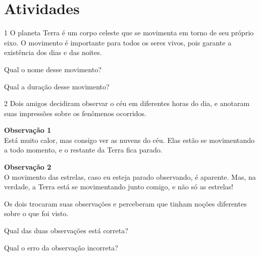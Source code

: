 \section*{Atividades}

\num{1} O planeta Terra é um corpo celeste que se movimenta em
torno de seu próprio eixo. O movimento é importante para todos os seres
vivos, pois garante a existência dos dias e das noites.

\begin{escolha}
\item Qual o nome desse movimento?\\

\item Qual a duração desse movimento?\\
\end{escolha}

\num{2} Dois amigos decidiram observar o céu em diferentes horas do
dia, e anotaram suas impressões sobre os fenômenos ocorridos.

\begin{mdframed}[linewidth=5pt,linecolor=salmao!20,backgroundcolor=salmao!20,roundcorner=20pt]
\textbf{Observação 1}\\
Está muito calor, mas consigo ver as nuvens
do céu. Elas estão se movimentando a todo momento, e o restante
da Terra fica parado.
\end{mdframed}

\begin{mdframed}[linewidth=5pt,linecolor=azul!20,backgroundcolor=azul!20,roundcorner=20pt]
\textbf{Observação 2}\\
O movimento das estrelas, caso eu esteja
parado observando, é aparente. Mas, na verdade, a Terra está se
movimentando junto comigo, e não só as estrelas!
\end{mdframed}

\noindent{}Os dois trocaram suas observações e perceberam que tinham noções
diferentes sobre o que foi visto.

\begin{escolha}
\item Qual das duas observações está correta?\\

\item Qual o erro da observação incorreta?\\
\end{escolha}

